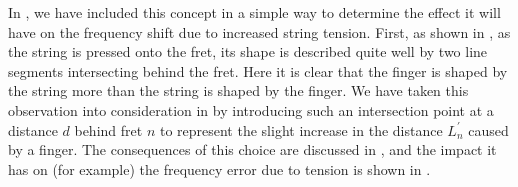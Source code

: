 
In , we have included this concept in a simple way to determine the effect it will have on the frequency shift due to increased string tension. First, as shown in , as the string is pressed onto the fret, its shape is described quite well by two line segments intersecting behind the fret. Here it is clear that the finger is shaped by the string more than the string is shaped by the finger. We have taken this observation into consideration in  by introducing such an intersection point at a distance $d$ behind fret $n$ to represent the slight increase in the distance $L_n^\prime$ caused by a finger. The consequences of this choice are discussed in , and the impact it has on (for example) the frequency error due to tension is shown in .



